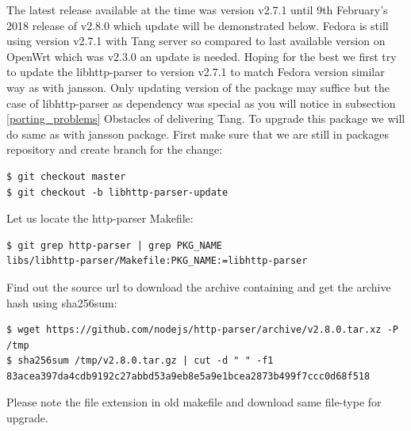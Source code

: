 The latest release available at the time was version v2.7.1 until 9th February's 2018 release of v2.8.0 which update will be demonstrated below.
Fedora is still using version v2.7.1 with Tang server so compared to last available version on OpenWrt which was v2.3.0 an update is needed.
Hoping for the best we first try to update the libhttp-parser to version v2.7.1 to match Fedora version similar way as with jansson.
Only updating version of the package may suffice but the case of libhttp-parser as dependency was special as you will notice in subsection \ref{porting_problems} Obstacles of delivering Tang.
To upgrade this package we will do same as with jansson package.
First make sure that we are still in packages repository and create branch for the change:
\begin{lstlisting}[columns=fixed,basicstyle=\ttfamily\footnotesize,tabsize=4,backgroundcolor=\color{yellow!10}]
$ git checkout master
$ git checkout -b libhttp-parser-update
\end{lstlisting}
Let us locate the http-parser Makefile:
\begin{lstlisting}[columns=fixed,basicstyle=\ttfamily\footnotesize,tabsize=4,backgroundcolor=\color{yellow!10}]
$ git grep http-parser | grep PKG_NAME
libs/libhttp-parser/Makefile:PKG_NAME:=libhttp-parser
\end{lstlisting}
Find out the source url to download the archive containing and get the archive hash using sha256sum:
\begin{lstlisting}[columns=fixed,basicstyle=\ttfamily\footnotesize,tabsize=4,backgroundcolor=\color{yellow!10}]
$ wget https://github.com/nodejs/http-parser/archive/v2.8.0.tar.xz -P /tmp
$ sha256sum /tmp/v2.8.0.tar.gz | cut -d " " -f1
83acea397da4cdb9192c27abbd53a9eb8e5a9e1bcea2873b499f7ccc0d68f518
\end{lstlisting}
Please note the file extension in old makefile and download same file-type for upgrade.

